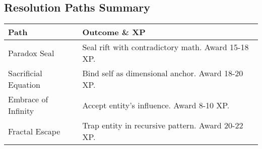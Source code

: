 \documentclass[11pt]{article}
\begin{document}
\subsection*{Resolution Paths Summary}

\begin{tabular}{|p{4cm}|p{8cm}|}
\hline
\rowcolor{shadecolor}
\textbf{Path} & \textbf{Outcome \& XP} \\
\hline
Paradox Seal & Seal rift with contradictory math. Award 15-18 XP. \\
Sacrificial Equation & Bind self as dimensional anchor. Award 18-20 XP. \\
Embrace of Infinity & Accept entity's influence. Award 8-10 XP. \\
Fractal Escape & Trap entity in recursive pattern. Award 20-22 XP. \\
\hline
\end{tabular}
\end{document}
